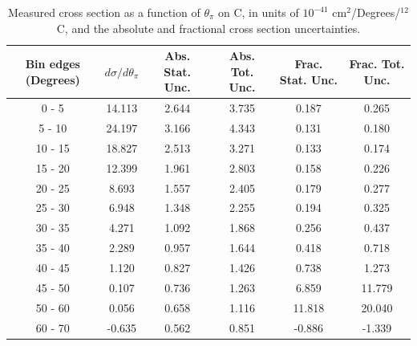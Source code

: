 \documentclass[aps,prl,twocolumn,superscriptaddress,nofootinbib]{revtex4-1}
\begin{document}
\begin{table}[h!]
  \centering
  \caption{Measured cross section as a function of $\theta_{\pi}$ on C, in units of
  $10^{-41}$ $\text{cm}^{2}$/Degrees/$^{12}$C, and the absolute and
  fractional cross section uncertainties.}
    \begin{tabular}{c||c||c|c||c|c}
      Bin edges (Degrees)  &  $d\sigma/d\theta_{\pi}$  &  Abs. Stat. Unc. & Abs. Tot. Unc.  &  Frac. Stat. Unc.  &  Frac. Tot. Unc. \\
      \hline\hline
        0 - 5 & 14.113 & 2.644 & 3.735 & 0.187 & 0.265 \\
       5 - 10 & 24.197 & 3.166 & 4.343 & 0.131 & 0.180 \\
      10 - 15 & 18.827 & 2.513 & 3.271 & 0.133 & 0.174 \\
      15 - 20 & 12.399 & 1.961 & 2.803 & 0.158 & 0.226 \\
      20 - 25 & 8.693 & 1.557 & 2.405 & 0.179 & 0.277 \\
      25 - 30 & 6.948 & 1.348 & 2.255 & 0.194 & 0.325 \\
      30 - 35 & 4.271 & 1.092 & 1.868 & 0.256 & 0.437 \\
      35 - 40 & 2.289 & 0.957 & 1.644 & 0.418 & 0.718 \\
      40 - 45 & 1.120 & 0.827 & 1.426 & 0.738 & 1.273 \\
      45 - 50 & 0.107 & 0.736 & 1.263 & 6.859 & 11.779 \\
      50 - 60 & 0.056 & 0.658 & 1.116 & 11.818 & 20.040 \\
      60 - 70 & -0.635 & 0.562 & 0.851 & -0.886 & -1.339 \\
    \end{tabular}
  \label{table:ThetaPiXSec_C}
\end{table}
\end{document}

